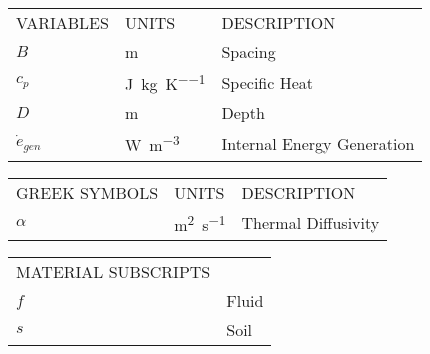 \begin{longtable}{p{} p{} p{}}

VARIABLES & UNITS & DESCRIPTION \\

$B$ & \si{\meter} & Spacing \\
$c_p$ & \si{\joule\per\kilogram\per\kelvin} & Specific Heat \\
$D$ & \si{\meter} & Depth \\
$\dot{e}_{gen}$ & \si{\watt\per\meter\cubed} & Internal Energy Generation \\

\end{longtable}

\begin{longtable}{p{} p{} p{}}

GREEK SYMBOLS & UNITS & DESCRIPTION \\

$\alpha$ & \si{\meter\squared\per\second} & Thermal Diffusivity \\ 

\end{longtable}

\begin{longtable}{p{} p{}}

MATERIAL SUBSCRIPTS & \\

$f$ & Fluid \\
$s$ & Soil \\ 

\end{longtable}
